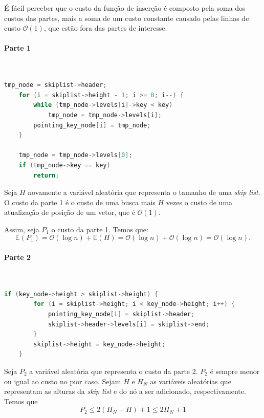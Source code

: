 \documentclass[paper=a4, fontsize=11pt]{scrartcl} %
\numberwithin{equation}{section}
\numberwithin{figure}{section}
\numberwithin{table}{section}
\numberwithin{definition}{section}
\numberwithin{theorem}{section}
\numberwithin{property}{section}
\numberwithin{proposition}{section}
\newcommand{\cO}{\ensuremath{\mathcal{O}}}
\renewcommand{\sl}{\textit{skip list}\xspace}
\newcommand{\Exp}{\ensuremath{{\mathbb{E}}}\xspace}
\begin{document}
É fácil perceber que o custo da função de inserção é composto pela soma dos custos das partes, mais a soma
de um custo constante causado pelas linhas de custo $\cO(1)$, que estão fora das partes de interesse.

\paragraph{Parte 1}
\ \\
\begin{lstlisting}[caption=Inserção Parte 1., language=C]
    tmp_node = skiplist->header;                        
    for (i = skiplist->height - 1; i >= 0; i--) {
        while (tmp_node->levels[i]->key < key)
            tmp_node = tmp_node->levels[i];
        pointing_key_node[i] = tmp_node;
    }                                                    

    tmp_node = tmp_node->levels[0];
    if (tmp_node->key == key)
        return;                                          
\end{lstlisting}

Seja $H$ novamente a variável aleatória que representa o tamanho de uma \sl.
O custo da parte 1 é o custo de uma busca mais $H$ vezes o custo de uma atualização de posição de um vetor,
que é $\cO(1)$.

Assim, seja $P_1$ o custo da parte 1. Temos que:
$$
  \Exp(P_1) = \cO(\log n) + \Exp(H) = \cO(\log n) + \cO(\log n) = \cO(\log n).
$$


\paragraph{Parte 2}
\ \\

\begin{lstlisting}[caption=Inserção Parte 2., language=C]
    if (key_node->height > skiplist->height) {            
        for (i = skiplist->height; i < key_node->height; i++) {
            pointing_key_node[i] = skiplist->header;
            skiplist->header->levels[i] = skiplist->end;
        }
        skiplist->height = key_node->height;
    }                                                      
\end{lstlisting}

Seja $P_2$ a variável aleatória que representa o custo da parte 2. $P_2$ é sempre menor ou igual ao custo no pior
caso. Sejam $H$ e $H_N$ as variáveis aleatórias que representam as alturas da \sl e do nó a ser adicionado,
respectivamente. Temos que
$$
P_2 \leq 2(H_N - H) + 1 \leq 2 H_N + 1 
$$
\end{document}
